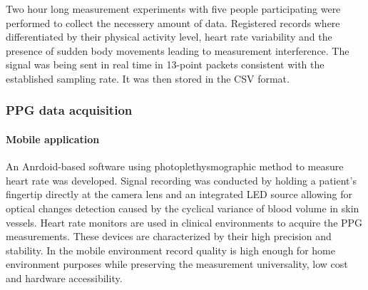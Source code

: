 \documentclass[journal]{IEEEtran}
\begin{document}
Two hour long measurement experiments with five people participating were performed to collect the necessery amount of data. Registered records where differentiated by their physical activity level, heart rate variability and the presence of sudden body movements leading to measurement interference. The signal was being sent in real time in 13-point packets consistent with the established sampling rate. It was then stored in the CSV format.


\subsubsection{PPG data acquisition}
\paragraph{Mobile application}
An Anrdoid-based software using photoplethysmographic method to measure heart rate was developed. Signal recording was conducted by holding a patient's fingertip directly at the camera lens and an integrated LED source allowing for optical changes detection caused by the cyclical variance of blood volume in skin vessels.
\newpage
Heart rate monitors are used in clinical environments to acquire the PPG measurements. These devices are characterized by their high precision and stability. In the mobile environment record quality is high enough for home environment purposes while preserving the measurement universality, low cost and hardware accessibility.
\end{document}
